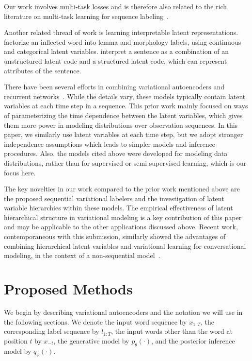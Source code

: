 \documentclass[11pt,a4paper]{article}
\newcommand{\klcomment}[1]{\textcolor{magenta}{\bf \small [ #1 --KL]}}
\renewcommand{\klcomment}[1]{}
\begin{document}
Our work involves multi-task losses and is therefore also related to the rich literature on
multi-task learning for sequence labeling~\cite[\emph{inter alia}]{plank2016multilingual,augenstein2017multi,bingel2017identifying,rei2017semi}.

Another related thread of work is learning interpretable latent representations. \citet{zhou2017multi} factorize an inflected word into lemma and morphology labels, using continuous and categorical latent variables. \citet{hu2017toward} interpret a sentence as a combination of an unstructured latent code and a structured latent code, which can represent attributes of the sentence.


There have been several efforts in combining variational autoencoders and recurrent networks~\cite{gregor2015draw,chung2015recurrent,fraccaro2016sequential}. While the details vary, these models typically contain latent variables at each time step in a sequence. This prior work mainly focused on ways of parameterizing the time dependence between the latent variables, which gives them more power in modeling distributions over observation sequences. In this paper, we similarly use latent variables at each time step, but we adopt stronger independence assumptions which leads to simpler models and inference procedures. Also, the models cited above were developed for modeling data distributions, rather than for supervised or semi-supervised learning, which is our focus here.

\klcomment{shortened this par as it seemed to be veering away from related work a bit.  please make sure I haven't removed anything important.}
The key novelties in
our work compared to the prior work mentioned above
are the proposed sequential variational labelers and the investigation of latent variable hierarchies within these models.  The empirical effectiveness of latent hierarchical structure in variational modeling is a key contribution of this paper and may be applicable to the other applications discussed above.  Recent work, contemporaneous with this submission, similarly showed the advantages of combining hierarchical latent variables and variational learning for conversational modeling, in the context of a non-sequential model~\cite{VHCR:2018:NAACL}.
\section{Proposed Methods}

We begin by describing variational autoencoders and the notation we will use in the following sections. We denote the input word sequence by $x_{1:T}$, the corresponding label sequence by $l_{1:T}$, the input words other than the word at position $t$ by $x_{-t}$, the generative model by $p_\theta(\cdot)$, and the posterior inference model by $q_\phi(\cdot)$.
\end{document}
